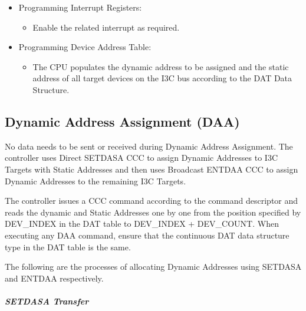 \documentclass[main\_\_EN.tex]{subfiles}
\begin{document}
\begin{itemize}
    \item Programming Interrupt Registers:
    \begin{itemize}
        \item Enable the related interrupt as required.
    \end{itemize}
    \item Programming Device Address Table:
    \begin{itemize}
        \item The CPU populates the dynamic address to be assigned and the static address of all target devices on the I3C bus according to the DAT Data Structure.
    \end{itemize}
\end{itemize}


\subsection{Dynamic Address Assignment (DAA)}

No data needs to be sent or received during Dynamic Address Assignment. The controller uses Direct SETDASA CCC to assign Dynamic Addresses to I3C Targets with Static Addresses and then uses Broadcast ENTDAA CCC to assign Dynamic Addresses to the remaining I3C Targets.

The controller issues a CCC command according to the command descriptor and reads the dynamic and Static Addresses one by one from the position specified by DEV\_INDEX in the DAT table to DEV\_INDEX + DEV\_COUNT. When executing any DAA command, ensure that the continuous DAT data structure type in the DAT table is the same.

The following are the processes of allocating Dynamic Addresses using SETDASA and ENTDAA respectively.

\subparagraph{SETDASA Transfer}
\end{document}
